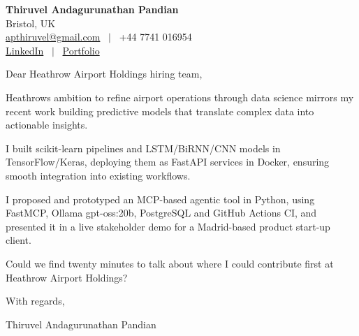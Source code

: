 \documentclass[11pt,a4paper]{article}
\begin{document}
\raggedright
\pagestyle{empty}

\begin{center}
    {\LARGE \color{linkblue} \textbf{Thiruvel Andagurunathan Pandian}}\\[0.2cm]
    Bristol, UK \\
    \href{mailto:apthiruvel@gmail.com}{apthiruvel@gmail.com} \ $|$ \ +44 7741 016954 \\
\href{https://www.linkedin.com/in/thiruvel-a-p/}{LinkedIn} \ $|$ \ \href{https://thiruvel-ap.github.io/PersonalPortfolio/}{Portfolio}
\end{center}

\vspace{0.4cm}

\noindent
Dear Heathrow Airport Holdings hiring team,

Heathrow\textquotesingle{}s ambition to refine airport operations through data science mirrors my recent work building predictive models that translate complex data into actionable insights.

I built scikit-learn pipelines and LSTM/BiRNN/CNN models in TensorFlow/Keras, deploying them as FastAPI services in Docker, ensuring smooth integration into existing workflows.

I proposed and prototyped an MCP-based agentic tool in Python, using FastMCP, Ollama gpt-oss:20b, PostgreSQL and GitHub Actions CI, and presented it in a live stakeholder demo for a Madrid-based product start-up client.

Could we find twenty minutes to talk about where I could contribute first at Heathrow Airport Holdings?

\vspace{0.5cm}

With regards,

Thiruvel Andagurunathan Pandian
\end{document}
